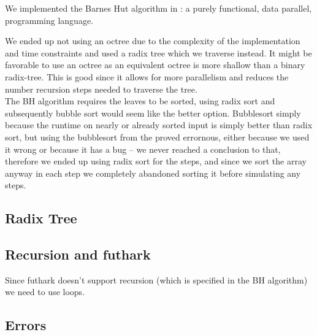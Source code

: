 We implemented the Barnes Hut algorithm in
: a purely functional,
data parallel, programming language.

We ended up not using an octree due to the complexity of the implementation and
time constraints and used a radix tree which we traverse instead. It might be
favorable to use an octree as an equivalent octree is more shallow than a binary
radix-tree. This is good since it allows for more parallelism and reduces the
number recursion steps needed to traverse the tree.\\

\noindent
The BH algorithm requires the leaves to be sorted, using radix sort and
subsequently bubble sort would seem like the better option. Bubblesort simply
because the runtime on nearly or already sorted input is simply better than
radix sort, but using the bubblesort from the
proved errornous, either because we used it wrong or because it has a bug -- we
never reached a conclusion to that, therefore we ended up using radix sort for
the steps, and since we sort the array anyway in each step we completely
abandoned sorting it before simulating any steps.

\subsection{Radix Tree}

\subsection{Recursion and futhark}
Since futhark doesn't support recursion (which is specified in the BH algorithm)
we need to use loops.

\lstset{firstnumber=41}

\subsection{Errors}
